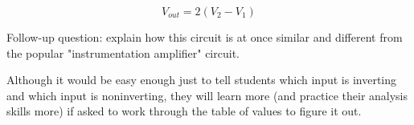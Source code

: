 $$V_{out} = 2(V_2 - V_1)$$

\vskip 10pt

Follow-up question: explain how this circuit is at once similar and different from the popular "instrumentation amplifier" circuit.







Although it would be easy enough just to tell students which input is inverting and which input is noninverting, they will learn more (and practice their analysis skills more) if asked to work through the table of values to figure it out.




